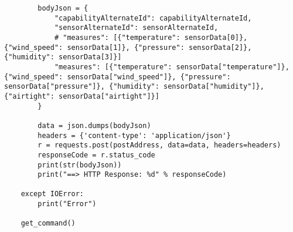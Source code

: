 \begin{lstlisting}
        bodyJson = {
            "capabilityAlternateId": capabilityAlternateId,
            "sensorAlternateId": sensorAlternateId,
            # "measures": [{"temperature": sensorData[0]}, {"wind_speed": sensorData[1]}, {"pressure": sensorData[2]}, {"humidity": sensorData[3]}]
            "measures": [{"temperature": sensorData["temperature"]}, {"wind_speed": sensorData["wind_speed"]}, {"pressure": sensorData["pressure"]}, {"humidity": sensorData["humidity"]}, {"airtight": sensorData["airtight"]}]
        }

        data = json.dumps(bodyJson)
        headers = {'content-type': 'application/json'}
        r = requests.post(postAddress, data=data, headers=headers)
        responseCode = r.status_code
        print(str(bodyJson))
        print("==> HTTP Response: %d" % responseCode)

    except IOError:
        print("Error")

    get_command()
\end{lstlisting}

